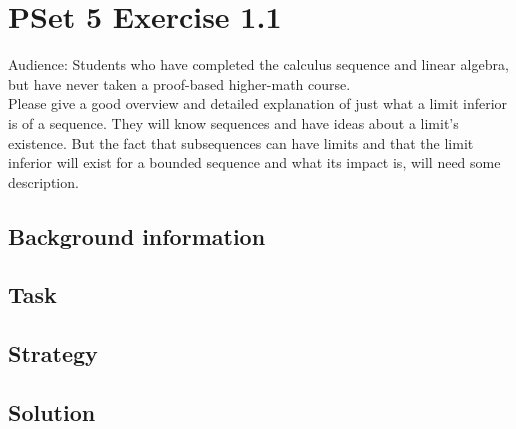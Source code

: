 \documentclass[11 pt]{article}
\begin{document}
\section{PSet 5 Exercise 1.1}
Audience: Students who have completed the calculus sequence and linear algebra, but have never taken a proof-based higher-math course.\\
Please give a good overview and detailed explanation of just what a limit inferior is of a sequence. They will know sequences and have ideas about a limit's existence. But the fact that subsequences can have limits and that the limit inferior will exist for a bounded sequence and what its impact is, will need some description.
\begin{multicols*}{2} 
\subsection{Background information}
\subsection{Task}
\subsection{Strategy}
\columnbreak
\subsection{Solution}
\end{multicols*}
\pagebreak
\end{document}
